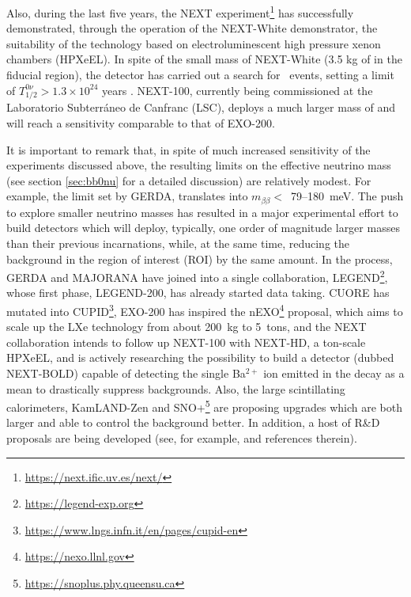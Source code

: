 Also, during the last five years, the NEXT experiment\footnote{\url{https://next.ific.uv.es/next/}} has successfully demonstrated, through the operation of the NEXT-White demonstrator, the suitability of the technology based on electroluminescent high pressure xenon chambers (HPXeEL). In spite of the small mass of NEXT-White (3.5 kg of  in the fiducial region), the detector has carried out a search for \bbonu\ events, setting a limit of \mbox{$T^{0\nu}_{1/2} > 1.3 \times 10^{24}$} years  \cite{NEXT:2023daz}. NEXT-100, currently being commissioned at the Laboratorio Subterr\'aneo de Canfranc (LSC), deploys a much larger mass of  and will reach a sensitivity comparable to that of EXO-200.

It is important to remark that, in spite of much increased sensitivity of the experiments discussed above, the resulting limits on the effective neutrino mass (see section \ref{sec:bb0nu} for a detailed discussion) are relatively modest. For example, the limit set by GERDA, translates into $m_{\beta\beta} <$~79--180~meV. The push to explore smaller neutrino masses has resulted in a major experimental effort to build detectors which will deploy, typically, one order of magnitude larger masses than their previous incarnations, while, at the same time, reducing the background in the region of interest (ROI) by the same amount. In the process, GERDA and MAJORANA have joined into a single collaboration, LEGEND\footnote{\url{https://legend-exp.org}}, whose first phase, LEGEND-200, has already started data taking. CUORE has mutated into CUPID\footnote{\url{https://www.lngs.infn.it/en/pages/cupid-en}}, EXO-200 has inspired the nEXO\footnote{\url{https://nexo.llnl.gov}} proposal, which aims to scale up the LXe technology from about 200~kg to 5~tons, and the NEXT collaboration intends to follow up NEXT-100 with NEXT-HD, a ton-scale HPXeEL, and is actively researching the possibility to build a detector (dubbed NEXT-BOLD) capable of detecting the single Ba$^{2+}$ ion emitted in the decay as a mean to drastically suppress backgrounds. Also, the large scintillating calorimeters, KamLAND-Zen and SNO+\footnote{\url{https://snoplus.phy.queensu.ca}} are proposing upgrades which are both larger and able to control the background better. In addition, a host of R\&D proposals are being developed (see, for example, \cite{Dell_Oro_2016} and references therein). 

